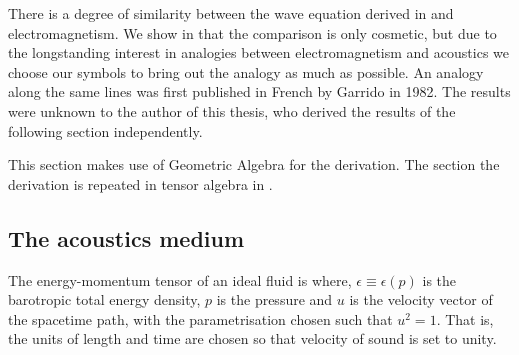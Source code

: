 There is a degree of similarity between the wave equation derived in  and electromagnetism.
We show in \secref{} that the comparison is only cosmetic,
but due to the longstanding interest in analogies between electromagnetism and acoustics we
choose our symbols to bring out the analogy as much as possible.
An analogy along the same lines was first published in French by Garrido\cite{Garrido1982} in 1982.
The results were unknown to the author of this thesis, who derived the results of the following section independently.

This section makes use of Geometric Algebra\cite{Hestenes1984,Doran2003} for the derivation.
The section the derivation is repeated in tensor algebra in .

\subsection{The acoustics medium}\label{sec:MaxwellAnalogue}

The energy-momentum tensor of an ideal fluid is\cite{LandauBook, Taub1978}
where, $\epsilon \equiv \epsilon(p)$ is the barotropic total energy density,
$p$ is the pressure
and 
$u$ is the velocity vector of the spacetime path, with the parametrisation chosen such that $u^2 =  1$. %
That is, the units of length and time are chosen so that velocity of sound is set to unity.

